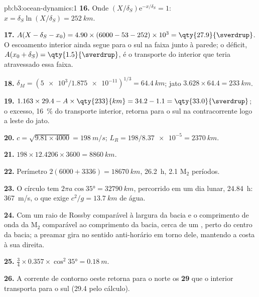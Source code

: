 \begin{solution}{pb:b3:ocean-dynamics:1}
\textbf{16.} Onde $(X/\delta_S)\mathrm e^{-x/\delta_S} = 1$: $x =
\delta_S\ln(X/\delta_S) = \qty{252}{km}$.

\textbf{17.} $A(X - \delta_S - x_0) = 4.90\times(6000 - 53 - 252)\times
10^3 = \qty{27.9}{\sverdrup}$. O escoamento interior ainda segue para o sul na
faixa junto à parede; o déficit, $A(x_0 + \delta_S) =
\qty{1.5}{\sverdrup}$, é o transporte do interior que teria atravessado
essa faixa.

\textbf{18.} $\delta_M = (\num{5e3}/\num{1.875e-11})^{1/3} = \qty{64.4}{km}$;
jato $3.628\times64.4 = \qty{233}{km}$.

\textbf{19.} $1.163\times29.4 - A\times\qty{233}{km} = 34.2 - 1.1 =
\qty{33.0}{\sverdrup}$; o excesso, \qty{16}{\percent} do transporte
interior, retorna para o sul na contracorrente logo a leste do jato.

\textbf{20.} $c = \sqrt{9.81\times4000} = \qty{198}{m/s}$; $L_R =
198/\num{8.37e-5} = \qty{2370}{km}$.

\textbf{21.} $198\times12.4206\times3600 = \qty{8860}{km}$.

\textbf{22.} Perímetro $2(6000 + 3336) = \qty{18670}{km}$, \qty{26.2}{h},
2.1 M$_2$ períodos.

\textbf{23.} O círculo tem $2\pi a\cos\ang{35} = \qty{32790}{km}$, percorrido
em um dia lunar, \qty{24.84}{h}: \qty{367}{m/s}, o que exige $c^2/g =
\qty{13.7}{km}$ de água.

\textbf{24.} Com um raio de Rossby comparável à largura da bacia
e o comprimento de onda da M$_2$ comparável ao comprimento da bacia, cerca de um
, perto do centro da bacia; a preamar gira no sentido anti-horário
em torno dele, mantendo a costa à sua direita.

\textbf{25.} $\tfrac34\times0.357\times\cos^2\ang{35} = \qty{0.18}{m}$.

\textbf{26.} A corrente de contorno oeste retorna para o norte os
\textbf{\qty[text-series-to-math=true]{29}{\sverdrup}} que o interior
transporta para o sul (\qty{29.4}{\sverdrup} pelo cálculo).
\end{solution}

